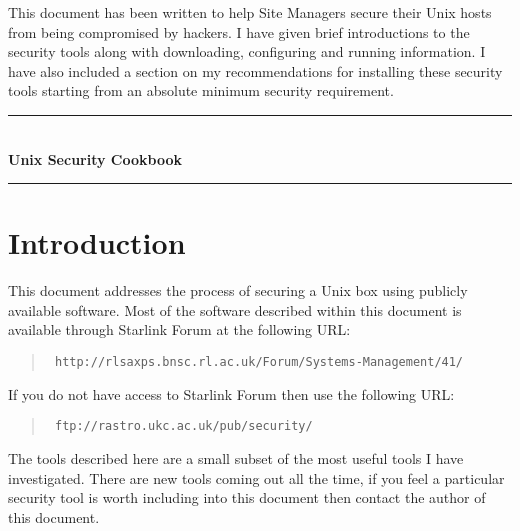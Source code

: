 \documentclass[11pt]{article}
\newcommand{\stardocinitials}  {SSN}
\newcommand{\stardocnumber}    {67.1}
\newcommand{\stardoctitle}     {Unix Security Cookbook}
\newcommand{\stardocabstract}  {

This document has been written to help Site Managers secure their
Unix hosts from being compromised by hackers. I have given brief
introductions to the security tools along with downloading, configuring 
and running information. I have also included a section on my 
recommendations for installing these security tools starting from an 
absolute minimum security requirement.
}
\newcommand{\stardocname}{\stardocinitials /\stardocnumber}
\newcommand{\htmladdnormallink}[2]{#1}
\newenvironment{latexonly}{}{}
\newcommand{\xlabel}[1]{}
\renewcommand{\thepage}{\roman{page}}
\begin{document}
\stardocabstract
\newpage
\begin{latexonly}
  \begin {center}
    \rule{80mm}{0.5mm} \\ [1ex]
    \vspace{5mm}
     {\Large\bf \stardoctitle} \\ [2.5ex]
    \rule{80mm}{0.5mm}
  \end{center}
  \vspace{30mm}
  \setlength{\parskip}{0mm}
  \tableofcontents
  \setlength{\parskip}{\medskipamount}
  \markright{\stardocname}
\end{latexonly}
\newpage
\renewcommand{\thepage}{\arabic{page}}
\setcounter{page}{1}

\section{\label{introduction}\xlabel{introduction}Introduction} 

This document addresses the process of securing a Unix
box using publicly available software. Most of the software described within
this document is available through Starlink Forum at the following URL:

\begin{quote}{\tt
\htmladdnormallink{http://rlsaxps.bnsc.rl.ac.uk/Forum/Systems-Management/41/}
{http://rlsaxps.bnsc.rl.ac.uk/Forum/Systems-Management/41/}}
\end{quote}

If you do not have access to Starlink Forum then use the following URL:

\begin{quote}{\tt
\htmladdnormallink{ftp://rastro.ukc.ac.uk/pub/security/}
{ftp://rastro.ukc.ac.uk/pub/security/}}
\end{quote}

The tools described here are a small subset of the most useful tools
I have investigated. There are new tools coming out all the time, if
you feel a particular security tool is worth including into this
document then contact the author of this document.
\end{document}
